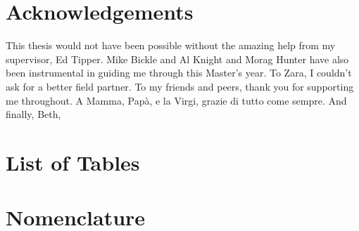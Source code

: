 \documentclass[hidelinks, 12pt]{article} %
\begin{document}

\newpage


\tableofcontents


\newpage


\section*{Acknowledgements}

This thesis would not have been possible without the amazing help from my supervisor, Ed Tipper. Mike Bickle and Al Knight and Morag Hunter have also been instrumental in guiding me through this Master's year. To Zara, I couldn't ask for a better field partner. To my friends and peers, thank you for supporting me throughout. A Mamma, Papà, e la Virgi, grazie di tutto come sempre. And finally, Beth, 


\newpage


\section*{List of Tables}

\newpage



\section*{Nomenclature}


\newpage


\FloatBarrier







\newpage




\newpage





\newpage





\newpage





\newpage

\nocite{*}

 
 

\newpage


\end{document}
